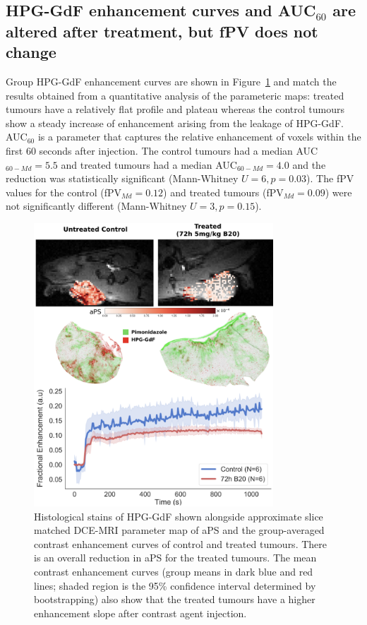 \subsection{\texorpdfstring{\acs{HPG-GdF}}{HPG-GdF} enhancement curves and \texorpdfstring{\acs{AUC}$_{60}$}{AUC60} are altered after treatment, but \texorpdfstring{\acs{fPV}}{fPV} does not change}

Group \acs{HPG-GdF} enhancement curves are shown in Figure~\ref{hpg:aPShistoEC} and match the results obtained from a quantitative analysis of the parameteric maps: treated tumours have a relatively flat profile and plateau whereas the control tumours show a steady increase of enhancement arising from the leakage of \acs{HPG-GdF}.
\acs{AUC}$_{60}$ is a parameter that captures the relative enhancement of voxels within the first 60 seconds after injection.
The control tumours had a median \acs{AUC}$_{60-Md} = 5.5$ and treated tumours had a median \acs{AUC}$_{60-Md} = 4.0$ and the reduction was statistically significant (Mann-Whitney $U = 6, p = 0.03$).
The \acs{fPV} values for the control (fPV$_{Md} = 0.12$) and treated tumours (fPV$_{Md} = 0.09$) were not significantly different (Mann-Whitney $U = 3, p = 0.15$).

\begin{figure}[htbp] %
  \centering
  \includegraphics[width=0.8\textwidth]{hpg/hpg-B20-images/hpg_aPShisto_ec.png} 
  \captionsetup{width=\linewidth}
  \caption{Histological stains of \acs{HPG-GdF} shown alongside approximate slice matched \acs{DCE-MRI} parameter map of \acs{aPS} and the group-averaged contrast enhancement curves of control and treated tumours. There is an overall reduction in \acs{aPS} for the treated tumours. The mean contrast enhancement curves (group means in dark blue and red lines; shaded region is the 95\% confidence interval determined by bootstrapping) also show that the treated tumours have a higher enhancement slope after contrast agent injection.}
  \label{hpg:aPShistoEC}
\end{figure}

